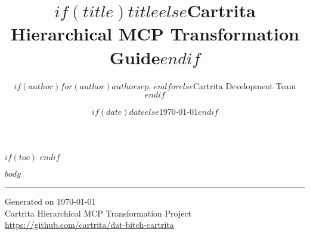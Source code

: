 \documentclass[$if(fontsize)$$fontsize$$else$11pt$endif$,$if(lang)$$babel-lang$$endif$,$if(papersize)$$papersize$paper$endif$,$for(classoption)$$classoption$$sep$,$endfor$]{article}
\title{$if(title)$$title$$else$Cartrita Hierarchical MCP Transformation Guide$endif$}
\author{$if(author)$$for(author)$$author$$sep$, $endfor$$else$Cartrita Development Team$endif$}
\date{$if(date)$$date$$else$\today$endif$}
\begin{document}
\maketitle
\thispagestyle{empty}

\newpage

$if(toc)$
\tableofcontents
\newpage
$endif$

$body$

\vfill
\hrule
\vspace{0.5cm}
\begin{center}
\footnotesize
Generated on \today \\
Cartrita Hierarchical MCP Transformation Project \\
\url{https://github.com/cartrita/dat-bitch-cartrita}
\end{center}
\end{document}
